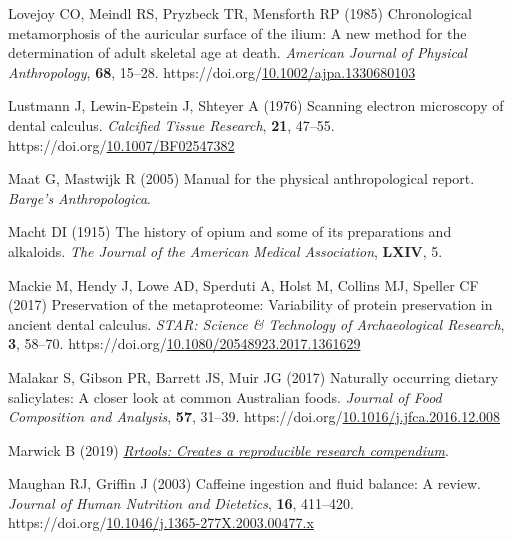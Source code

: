 \documentclass[
  11pt,
  leqno]{scrartcl}
\newlength{\cslhangindent}
\newenvironment{CSLReferences}[2] %
 {\begin{list}{}{%
  \setlength{\itemindent}{0pt}
  \setlength{\leftmargin}{0pt}
  \setlength{\parsep}{0pt}
  \ifodd #1
   \setlength{\leftmargin}{\cslhangindent}
   \setlength{\itemindent}{-1\cslhangindent}
  \fi
  \setlength{\itemsep}{#2\baselineskip}}}
 {\end{list}}
\begin{document}
\begin{CSLReferences}{1}{0}
Lovejoy CO, Meindl RS, Pryzbeck TR, Mensforth RP (1985) Chronological
metamorphosis of the auricular surface of the ilium: {A} new method for
the determination of adult skeletal age at death. \emph{American Journal
of Physical Anthropology}, \textbf{68}, 15--28.
https://doi.org/\href{https://doi.org/10.1002/ajpa.1330680103}{10.1002/ajpa.1330680103}

Lustmann J, Lewin-Epstein J, Shteyer A (1976) Scanning electron
microscopy of dental calculus. \emph{Calcified Tissue Research},
\textbf{21}, 47--55.
https://doi.org/\href{https://doi.org/10.1007/BF02547382}{10.1007/BF02547382}

Maat G, Mastwijk R (2005) Manual for the physical anthropological
report. \emph{Barge's Anthropologica}.

Macht DI (1915) The history of opium and some of its preparations and
alkaloids. \emph{The Journal of the American Medical Association},
\textbf{LXIV}, 5.

Mackie M, Hendy J, Lowe AD, Sperduti A, Holst M, Collins MJ, Speller CF
(2017) Preservation of the metaproteome: Variability of protein
preservation in ancient dental calculus. \emph{STAR: Science \&
Technology of Archaeological Research}, \textbf{3}, 58--70.
https://doi.org/\href{https://doi.org/10.1080/20548923.2017.1361629}{10.1080/20548923.2017.1361629}

Malakar S, Gibson PR, Barrett JS, Muir JG (2017) Naturally occurring
dietary salicylates: {A} closer look at common {Australian} foods.
\emph{Journal of Food Composition and Analysis}, \textbf{57}, 31--39.
https://doi.org/\href{https://doi.org/10.1016/j.jfca.2016.12.008}{10.1016/j.jfca.2016.12.008}

Marwick B (2019)
\emph{\href{https://github.com/benmarwick/rrtools}{Rrtools: {Creates} a
reproducible research compendium}}.

Maughan RJ, Griffin J (2003) Caffeine ingestion and fluid balance: A
review. \emph{Journal of Human Nutrition and Dietetics}, \textbf{16},
411--420.
https://doi.org/\href{https://doi.org/10.1046/j.1365-277X.2003.00477.x}{10.1046/j.1365-277X.2003.00477.x}


\end{CSLReferences}
\end{document}
